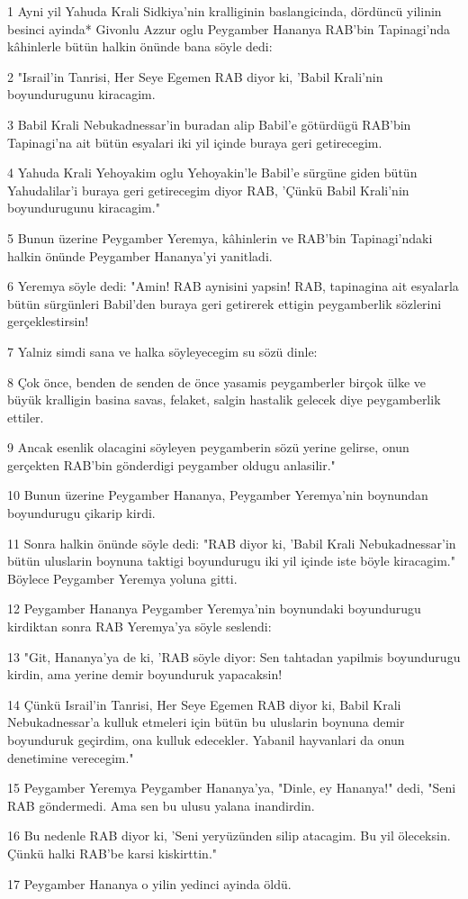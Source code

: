 \par 1 Ayni yil Yahuda Krali Sidkiya'nin kralliginin baslangicinda, dördüncü yilinin besinci ayinda* Givonlu Azzur oglu Peygamber Hananya RAB'bin Tapinagi'nda kâhinlerle bütün halkin önünde bana söyle dedi:
\par 2 "Israil'in Tanrisi, Her Seye Egemen RAB diyor ki, 'Babil Krali'nin boyundurugunu kiracagim.
\par 3 Babil Krali Nebukadnessar'in buradan alip Babil'e götürdügü RAB'bin Tapinagi'na ait bütün esyalari iki yil içinde buraya geri getirecegim.
\par 4 Yahuda Krali Yehoyakim oglu Yehoyakin'le Babil'e sürgüne giden bütün Yahudalilar'i buraya geri getirecegim diyor RAB, 'Çünkü Babil Krali'nin boyundurugunu kiracagim."
\par 5 Bunun üzerine Peygamber Yeremya, kâhinlerin ve RAB'bin Tapinagi'ndaki halkin önünde Peygamber Hananya'yi yanitladi.
\par 6 Yeremya söyle dedi: "Amin! RAB aynisini yapsin! RAB, tapinagina ait esyalarla bütün sürgünleri Babil'den buraya geri getirerek ettigin peygamberlik sözlerini gerçeklestirsin!
\par 7 Yalniz simdi sana ve halka söyleyecegim su sözü dinle:
\par 8 Çok önce, benden de senden de önce yasamis peygamberler birçok ülke ve büyük kralligin basina savas, felaket, salgin hastalik gelecek diye peygamberlik ettiler.
\par 9 Ancak esenlik olacagini söyleyen peygamberin sözü yerine gelirse, onun gerçekten RAB'bin gönderdigi peygamber oldugu anlasilir."
\par 10 Bunun üzerine Peygamber Hananya, Peygamber Yeremya'nin boynundan boyundurugu çikarip kirdi.
\par 11 Sonra halkin önünde söyle dedi: "RAB diyor ki, 'Babil Krali Nebukadnessar'in bütün uluslarin boynuna taktigi boyundurugu iki yil içinde iste böyle kiracagim." Böylece Peygamber Yeremya yoluna gitti.
\par 12 Peygamber Hananya Peygamber Yeremya'nin boynundaki boyundurugu kirdiktan sonra RAB Yeremya'ya söyle seslendi:
\par 13 "Git, Hananya'ya de ki, 'RAB söyle diyor: Sen tahtadan yapilmis boyundurugu kirdin, ama yerine demir boyunduruk yapacaksin!
\par 14 Çünkü Israil'in Tanrisi, Her Seye Egemen RAB diyor ki, Babil Krali Nebukadnessar'a kulluk etmeleri için bütün bu uluslarin boynuna demir boyunduruk geçirdim, ona kulluk edecekler. Yabanil hayvanlari da onun denetimine verecegim."
\par 15 Peygamber Yeremya Peygamber Hananya'ya, "Dinle, ey Hananya!" dedi, "Seni RAB göndermedi. Ama sen bu ulusu yalana inandirdin.
\par 16 Bu nedenle RAB diyor ki, 'Seni yeryüzünden silip atacagim. Bu yil öleceksin. Çünkü halki RAB'be karsi kiskirttin."
\par 17 Peygamber Hananya o yilin yedinci ayinda öldü.

